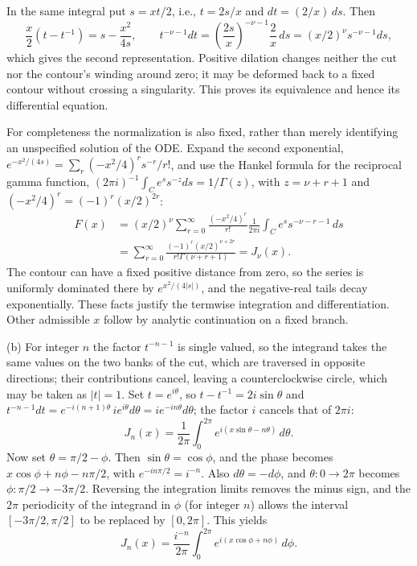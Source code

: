 In the same integral put $s=xt/2$, i.e., $t=2s/x$ and
$dt=(2/x)\,ds$. Then
\[
\frac x2(t-t^{-1})=s-\frac{x^2}{4s},\qquad
t^{-\nu-1}dt=\left(\frac{2s}x\right)^{-\nu-1}\frac2x\,ds
=(x/2)^\nu s^{-\nu-1}ds,
\]
which gives the second representation. Positive dilation changes
neither the cut nor the contour's winding around zero; it may be
deformed back to a fixed contour without crossing a singularity.
This proves its equivalence and hence its differential equation.

For completeness the normalization is also fixed, rather than merely
identifying an unspecified solution of the ODE. Expand the second
exponential, $e^{-x^2/(4s)}=\sum_r(-x^2/4)^rs^{-r}/r!$, and use the
Hankel formula for the reciprocal gamma function,
$(2\pi i)^{-1}\int_Ce^ss^{-z}ds=1/\Gamma(z)$, with $z=\nu+r+1$ and
$(-x^2/4)^r=(-1)^r(x/2)^{2r}$:
\begin{align*}
F(x)&=(x/2)^\nu\sum_{r=0}^{\infty}
 \frac{(-x^2/4)^r}{r!}
 \frac1{2\pi i}\int_C e^s s^{-\nu-r-1}\,ds\\
&=\sum_{r=0}^{\infty}
 \frac{(-1)^r(x/2)^{\nu+2r}}{r!\Gamma(\nu+r+1)}
=J_\nu(x).
\end{align*}
The contour can have a fixed positive distance from zero, so the
series is uniformly dominated there by $e^{x^2/(4|s|)}$, and the
negative-real tails decay exponentially. These facts justify the
termwise integration and differentiation. Other admissible $x$ follow
by analytic continuation on a fixed branch.

(b) For integer $n$ the factor $t^{-n-1}$ is single valued, so the
integrand takes the same values on the two banks of the cut, which
are traversed in opposite directions; their contributions cancel,
leaving a counterclockwise circle, which may be taken as $|t|=1$.
Set $t=e^{i\theta}$, so $t-t^{-1}=2i\sin\theta$ and
$t^{-n-1}dt=e^{-i(n+1)\theta}\,ie^{i\theta}d\theta
=i e^{-in\theta}d\theta$; the factor $i$ cancels that of $2\pi i$:
\[
J_n(x)=\boxed{\frac1{2\pi}\int_0^{2\pi}
 e^{i(x\sin\theta-n\theta)}\,d\theta}.
\]
Now set $\theta=\pi/2-\phi$. Then $\sin\theta=\cos\phi$, and the
phase becomes $x\cos\phi+n\phi-n\pi/2$, with
$e^{-in\pi/2}=i^{-n}$. Also $d\theta=-d\phi$, and $\theta:0\to2\pi$
becomes $\phi:\pi/2\to-3\pi/2$. Reversing the integration limits
removes the minus sign, and the $2\pi$ periodicity of the integrand
in $\phi$ (for integer $n$) allows the interval $[-3\pi/2,\pi/2]$ to
be replaced by $[0,2\pi]$. This yields
\[
\boxed{J_n(x)=\frac{i^{-n}}{2\pi}\int_0^{2\pi}
e^{i(x\cos\phi+n\phi)}\,d\phi}.
\]

